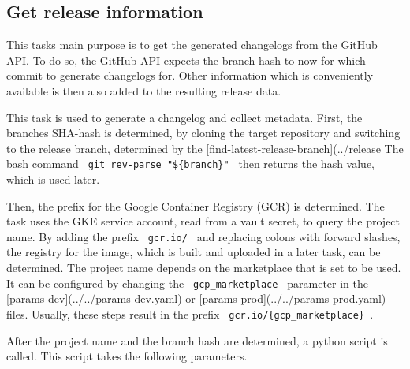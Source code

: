 \subsection{Get release information}\label{subsec:get-release-information}

This tasks main purpose is to get the generated changelogs from the GitHub API.
To do so, the GitHub API expects the branch hash to now for which commit to generate changelogs for.
Other information which is conveniently available is then also added to the resulting release data.

This task is used to generate a changelog and collect metadata.
First, the branches SHA-hash is determined, by cloning the target repository and switching to the release branch, determined by the [find-latest-release-branch](../release%
The bash command \verb| git rev-parse "${branch}" | then returns the hash value, which is used later.

Then, the prefix for the Google Container Registry (GCR) is determined.
The task uses the GKE service account, read from a vault secret, to query the project name.
By adding the prefix \verb| gcr.io/ | and replacing colons with forward slashes, the registry for the image, which is built and uploaded in a later task, can be determined.
The project name depends on the marketplace that is set to be used.
It can be configured by changing the \verb| gcp_marketplace | parameter in the [params-dev](../../params-dev.yaml) or [params-prod](../../params-prod.yaml) files.
Usually, these steps result in the prefix \verb| gcr.io/{gcp_marketplace} |.

After the project name and the branch hash are determined, a python script is called.
This script takes the following parameters.

